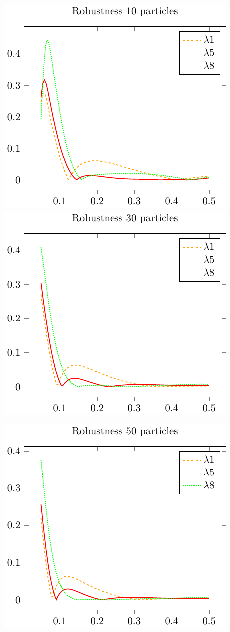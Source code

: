 \includegraphics{./gfx/robustness_compare10.pdf}
\includegraphics{./gfx/robustness_compare30.pdf}
\begin{center}
    \includegraphics{./gfx/robustness_compare50.pdf}
\end{center}
